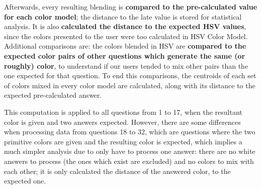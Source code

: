  \par
%
Afterwards, every resulting blending is \textbf{compared to the pre-calculated value for each color model}; the distance to the late value is stored for statistical analysis. It is
also \textbf{calculated the distance to the expected HSV values}, since the colors presented to the user were too calculated in HSV Color Model. Additional comparisons are: the colors
blended in HSV are \textbf{compared to the expected color pairs of other questions which generate the same (or roughly) color}, to understand if our users tended to mix other pairs
than the one expected for that question. To end this comparisons, the centroids of each set of colors mixed in every color model are calculated, along with its distance to the expected
pre-calculated answer. \par
%
This computation is applied to all questions from 1 to 17, when the resultant color is given and two answers expected. However, there are some differences when processing
data from questions 18 to 32, which are questions where the two primitive colors are given and the resulting color is expected, which implies a much simpler analysis due to only have to
process one answer: there are no white answers to process (the ones which exist are excluded) and no colors to mix with each other; it is only calculated the distance of the
answered color, to the expected one. \par
%
